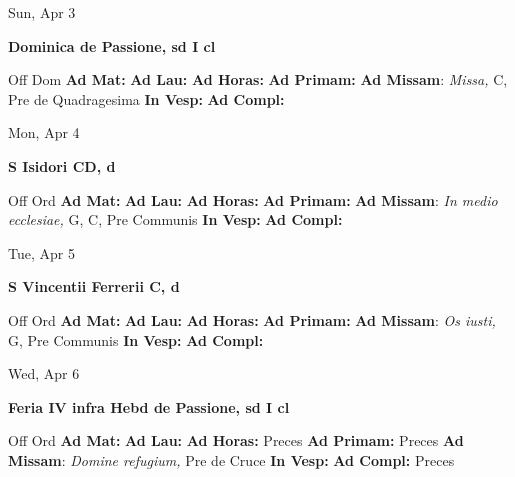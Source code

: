 \documentclass[10pt]{article}
\begin{document}
\begin{minipage}{3.5in}
\vspace{2em}\begin{center}
Sun, Apr 3
\end{center}\textbf{ \large Dominica de Passione, \textnormal{\normalsize sd I cl}}
\begin{justify}
Off Dom
\textbf{Ad Mat: }
\textbf{Ad Lau: }
\textbf{Ad Horas: }
\textbf{Ad Primam: }
\textbf{Ad Missam}: \textit{Missa,} C, Pre de Quadragesima
\textbf{In Vesp: }
\textbf{Ad Compl: }\end{justify}
\end{minipage}



\begin{minipage}{3.5in}
\vspace{2em}\begin{center}
Mon, Apr 4
\end{center}\textbf{ \large S Isidori CD, \textnormal{\normalsize d}}
\begin{justify}
Off Ord
\textbf{Ad Mat: }
\textbf{Ad Lau: }
\textbf{Ad Horas: }
\textbf{Ad Primam: }
\textbf{Ad Missam}: \textit{In medio ecclesiae,} G, C, Pre Communis
\textbf{In Vesp: }
\textbf{Ad Compl: }\end{justify}
\end{minipage}



\begin{minipage}{3.5in}
\vspace{2em}\begin{center}
Tue, Apr 5
\end{center}\textbf{ \large S Vincentii Ferrerii C, \textnormal{\normalsize d}}
\begin{justify}
Off Ord
\textbf{Ad Mat: }
\textbf{Ad Lau: }
\textbf{Ad Horas: }
\textbf{Ad Primam: }
\textbf{Ad Missam}: \textit{Os iusti,} G, Pre Communis
\textbf{In Vesp: }
\textbf{Ad Compl: }\end{justify}
\end{minipage}



\begin{minipage}{3.5in}
\vspace{2em}\begin{center}
Wed, Apr 6
\end{center}\textbf{ \large Feria IV infra Hebd de Passione, \textnormal{\normalsize sd I cl}}
\begin{justify}
Off Ord
\textbf{Ad Mat: }
\textbf{Ad Lau: }
\textbf{Ad Horas: }Preces
\textbf{Ad Primam: }Preces
\textbf{Ad Missam}: \textit{Domine refugium,} Pre de Cruce
\textbf{In Vesp: }
\textbf{Ad Compl: }Preces\end{justify}
\end{minipage}
\end{document}
